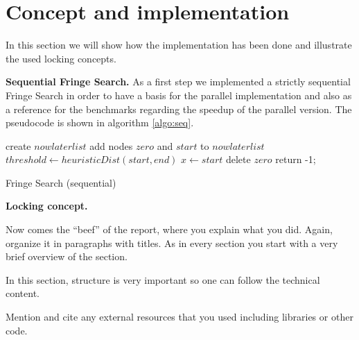 \documentclass[letterpaper]{article}
\newcommand{\mypar}[1]{{\bf #1.}}
\begin{document}
\section{Concept and implementation}\label{sec:impl}

In this section we will show how the implementation has been done and illustrate  the used locking concepts.

\mypar{Sequential Fringe Search}
As a first step we implemented a strictly sequential Fringe Search in order to have a basis for the parallel implementation and also as a reference for the benchmarks regarding the speedup of the parallel version. The pseudocode is shown in algorithm \ref{algo:seq}.
\begin{algorithm}[h]
 \SetInd{0.5em}{0.5em}
 create $nowlaterlist$\;
 add nodes $zero$ and $start$ to $nowlaterlist$\;
 $threshold \leftarrow heuristicDist(start, end)$\;
 $x \leftarrow start$\;
delete $zero$\;
return -1; 
\caption{Fringe Search (sequential)\label{algo:seq}}
\end{algorithm}

\mypar{Locking concept}

Now comes the ``beef'' of the report, where you explain what you
did. Again, organize it in paragraphs with titles. As in every section
you start with a very brief overview of the section.

In this section, structure is very important so one can follow the technical content.

Mention and cite any external resources that you used including libraries or other code.
\end{document}
